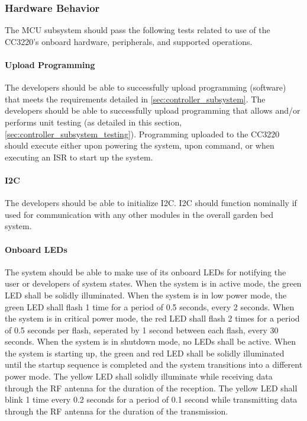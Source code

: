 \subsubsection{Hardware Behavior}
The MCU subsystem should pass the following tests related to use of the
CC3220's onboard hardware, peripherals, and supported operations.

\paragraph{Upload Programming} The developers should be able to successfully
upload programming (software) that meets the requirements detailed in
\autoref{sec:controller_subsystem}. The developers should be able to
successfully upload programming that allows and/or performs unit testing
(as detailed in this section, \autoref{sec:controller_subsystem_testing}).
Programming uploaded to the CC3220 should execute either upon powering the
system, upon command, or when executing an ISR to start up the system.

\paragraph{I2C} The developers should be able to initialize I2C. I2C should
function nominally if used for communication with any other modules in the
overall garden bed system.

\paragraph{Onboard LEDs} The system should be able to make use of its onboard
LEDs for notifying the user or developers of system states. 
When the system is in active mode, the green LED shall be solidly illuminated.
When the system is in low power mode, the green LED shall flash 1 time for a
period of 0.5 seconds, every 2 seconds. When the system is in critical power
mode, the red LED shall flash 2 times for a period of 0.5 seconds per flash,
seperated by 1 second between each flash, every 30 seconds. When the system is
in shutdown mode, no LEDs shall be active. When the system is starting up, the
green and red LED shall be solidly illuminated until the startup sequence is
completed and the system transitions into a different power mode. The yellow
LED shall solidly illuminate while receiving data through the RF antenna for
the duration of the reception.
The yellow LED shall blink 1 time every 0.2 seconds for a period of 0.1 second
while transmitting data through the RF antenna for the duration of the
transmission.

